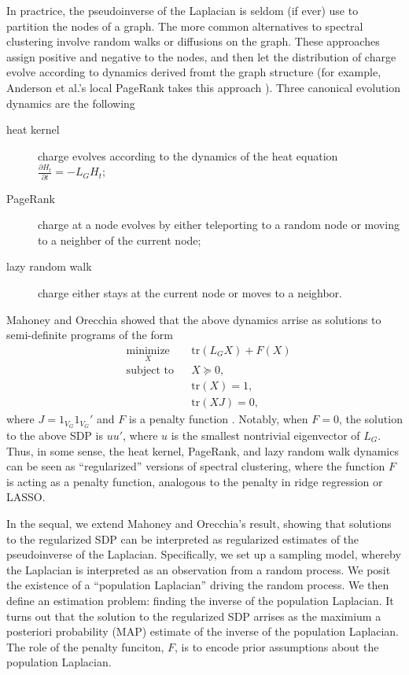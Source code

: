 \documentclass[12pt]{article}
\theoremstyle{plain}
\begin{document}
In practrice, the pseudoinverse of the Laplacian is seldom (if ever)
use to partition the nodes of a graph.  The more common alternatives
to spectral clustering involve random walks or diffusions on the
graph.  These approaches assign positive and negative to the nodes,
and then let the distribution of charge evolve according to dynamics
derived fromt the graph structure (for example, Anderson et al.'s local
PageRank takes this approach \cite{andersen2006local}).
Three canonical evolution dynamics are the following
\begin{description}
  \item[heat kernel]
    charge evolves according to the dynamics of the heat equation
    $\frac{\partial H_t}{\partial t} = - L_G H_t$;
  \item[PageRank]
    charge at a node evolves by either teleporting to a random node or moving
    to a neighber of the current node;
  \item[lazy random walk]
    charge either stays at the current node or moves to a neighbor.
\end{description}
Mahoney and Orecchia showed that the above dynamics arrise
as solutions to semi-definite programs of the form
\[
\begin{aligned}
  & \underset{X}{\text{minimize}}
  & & \mathrm{tr}(L_G X) + F(X) \\
  & \text{subject to}
  & & X \succeq 0, \\
  & & & \mathrm{tr}(X) = 1, \\
  & & & \mathrm{tr}(X J) = 0,
\end{aligned}
\]
where $J = 1_{V_G} 1_{V_G}'$ and $F$ is a penalty function
\cite{mahoney2010implementing}.  Notably, when $F = 0$, the solution
to the above SDP is $u u'$, where $u$ is the smallest nontrivial
eigenvector of $L_G$.  Thus, in some sense, the heat kernel, PageRank,
and lazy random walk dynamics can be seen as ``regularized'' versions
of spectral clustering, where the function $F$ is acting as a penalty
function, analogous to the penalty in ridge regression or LASSO.

In the sequal, we extend Mahoney and Orecchia's
result, showing that solutions to the regularized SDP can be
interpreted as regularized estimates of the pseudoinverse of the
Laplacian.  Specifically, we set up a sampling model, whereby the
Laplacian is interpreted as an observation from a random process.  We
posit the existence of a ``population Laplacian'' driving the random
process.  We then define an estimation problem: finding the inverse of
the population Laplacian.  It turns out that the solution to the
regularized SDP arrises as the maximium a posteriori probability (MAP)
estimate of the inverse of the population Laplacian.  The role of the
penalty funciton, $F$, is to encode prior assumptions about the
population Laplacian.
\end{document}
